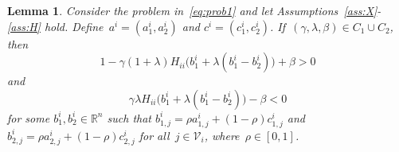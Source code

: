 \documentclass[9pt,shortpaper,twoside,web]{ieeecolor}
\newcommand{\V}{\ensuremath{\mathcal{V}}\xspace}
\newtheorem{lemma}{Lemma}
\begin{document}
    \begin{lemma} \label{lem:new}
     Consider the problem in~\eqref{eq:prob1} 
     and let Assumptions~\ref{ass:X}-\ref{ass:H} hold. Define~$a^i=(a^i_1,a^i_2)$ and $c^i=(c^i_1,c^i_2)$.
     If~$(\gamma,\lambda,\beta)\in C_1\cup C_2$, then 
    \begin{equation} \label{eq:lem2first}
        1- \gamma(1+\lambda)H_{ii}\big(b^i_1+\lambda(b^i_1-b^i_2)\big) + \beta > 0
    \end{equation}
    and
    \begin{equation} \label{eq:lem2second}
        \gamma\lambda H_{ii}\big(b^i_1+\lambda(b^i_1-b^i_2)\big) - \beta < 0
    \end{equation}
    for some $b^i_1,b^i_2 \in \mathbb{R}^n$ such that $b^i_{1,j} =\rho a^i_{1,j}+(1-\rho)c^i_{1,j}$ and~$b^i_{2,j}=\rho a^i_{2,j}+(1-\rho)c^i_{2,j}$ for all~$j \in \V_i$, where~$\rho \in [0, 1]$.
\end{lemma}
\end{document}
